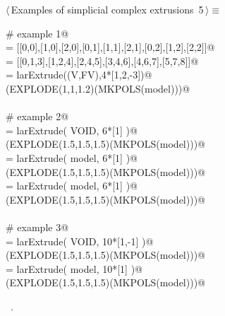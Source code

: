 \documentclass[11pt,oneside]{article}	%
\begin{document}
\begin{flushleft} \small \label{scrap5}
\protect{}$\langle\,$Examples of simplicial complex extrusions\nobreak\ {\footnotesize 5}$\,\rangle\equiv$
\vspace{-1ex}
\begin{list}{}{} \item
\mbox{}\verb@# example 1@\\
\mbox{}\verb@V = [[0,0],[1,0],[2,0],[0,1],[1,1],[2,1],[0,2],[1,2],[2,2]]@\\
\mbox{}\verb@FV = [[0,1,3],[1,2,4],[2,4,5],[3,4,6],[4,6,7],[5,7,8]]@\\
\mbox{}\verb@model = larExtrude((V,FV),4*[1,2,-3])@\\
\mbox{}\verb@VIEW(EXPLODE(1,1,1.2)(MKPOLS(model)))@\\
\mbox{}\verb@@\\
\mbox{}\verb@# example 2@\\
\mbox{}\verb@model = larExtrude( VOID, 6*[1] )@\\
\mbox{}\verb@VIEW(EXPLODE(1.5,1.5,1.5)(MKPOLS(model)))@\\
\mbox{}\verb@model = larExtrude( model, 6*[1] )@\\
\mbox{}\verb@VIEW(EXPLODE(1.5,1.5,1.5)(MKPOLS(model)))@\\
\mbox{}\verb@model = larExtrude( model, 6*[1] )@\\
\mbox{}\verb@VIEW(EXPLODE(1.5,1.5,1.5)(MKPOLS(model)))@\\
\mbox{}\verb@@\\
\mbox{}\verb@# example 3@\\
\mbox{}\verb@model = larExtrude( VOID, 10*[1,-1] )@\\
\mbox{}\verb@VIEW(EXPLODE(1.5,1.5,1.5)(MKPOLS(model)))@\\
\mbox{}\verb@model = larExtrude( model, 10*[1] )@\\
\mbox{}\verb@VIEW(EXPLODE(1.5,1.5,1.5)(MKPOLS(model)))@\\
\mbox{}\verb@@{\NWsep}
\end{list}
\vspace{-1ex}
\footnotesize\addtolength{\baselineskip}{-1ex}
\begin{list}{}{\setlength{\itemsep}{-\parsep}\setlength{\itemindent}{-\leftmargin}}
\item \NWtxtMacroRefIn\ .
\end{list}
\end{flushleft}
\end{document}
